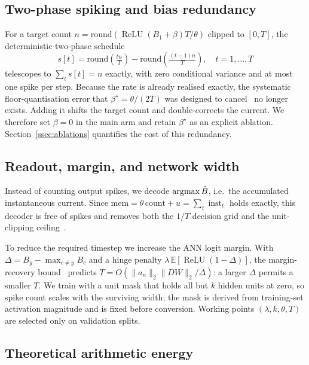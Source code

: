 \subsection{Two-phase spiking and bias redundancy}
\label{ssec:twophase}

For a target count $n=\mathrm{round}(\operatorname{ReLU}(B_1+\beta)T/\theta)$ clipped to $[0,T]$, the deterministic two-phase schedule
\begin{equation}
s[t] = \mathrm{round}\!\left(\tfrac{t n}{T}\right) - \mathrm{round}\!\left(\tfrac{(t-1)n}{T}\right),\quad t=1,\dots,T
\label{eq:dtp}
\end{equation}
telescopes to $\sum_t s[t]=n$ exactly, with zero conditional variance and at most one spike per step. Because the rate is already realised exactly, the systematic floor-quantisation error that $\beta^\star=\theta/(2T)$ was designed to cancel~\cite{deng2021,wu2024ftbc} no longer exists. Adding it shifts the target count and double-corrects the current. We therefore set $\beta=0$ in the main arm and retain $\beta^\star$ as an explicit ablation. Section~\ref{ssec:ablations} quantifies the cost of this redundancy.

\subsection{Readout, margin, and network width}
\label{ssec:components}

Instead of counting output spikes, we decode $\operatorname{argmax}\hat{B}$, i.e.\ the accumulated instantaneous current. Since $\mathrm{mem}=\theta\,\mathrm{count}+u=\sum_t \operatorname{inst}_t$ holds exactly, this decoder is free of spikes and removes both the $1/T$ decision grid and the unit-clipping ceiling~\cite{dualphase2024}.

To reduce the required timestep we increase the ANN logit margin. With $\Delta = B_{y} - \max_{c\ne y} B_c$ and a hinge penalty $\lambda\,\mathbb{E}[\operatorname{ReLU}(1-\Delta)]$, the margin-recovery bound~\cite{deng2021} predicts $T = O(\|a_n\|_2\|DW\|_2/\Delta)$: a larger $\Delta$ permits a smaller $T$. We train with a unit mask that holds all but $k$ hidden units at zero, so spike count scales with the surviving width; the mask is derived from training-set activation magnitude and is fixed before conversion. Working points $(\lambda, k, \theta, T)$ are selected only on validation splits.

\subsection{Theoretical arithmetic energy}
\label{ssec:energy}

